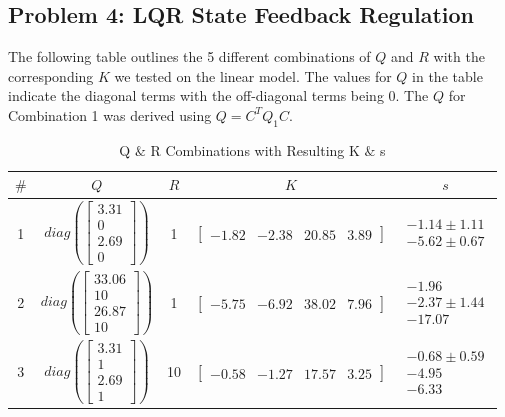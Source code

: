 \subsection*{Problem 4: LQR State Feedback Regulation}

The following table outlines the 5 different combinations of $Q$ and $R$ with the corresponding $K$ we tested on the linear model. The values for $Q$ in the table indicate the diagonal terms with the off-diagonal terms being 0. The $Q$ for Combination 1 was derived using $Q = C^TQ_1C$.

\begin{table}[!ht]
    \centering
    \caption{Q $\&$ R Combinations with Resulting K $\&$ s}
    \begin{tabular}{|*5{c|}}
        \hline
        $\#$ & $Q$                                                                           & $R$ & $K$                                                           & $s$                                                             \\ [0.5ex]
        \hline
        1    & $diag\left(\begin{bmatrix}3.31 \\ 0  \\ 2.69 \\ 0 \end{bmatrix}\right)$       & 1   & $\begin{bmatrix} -1.82 & -2.38 & 20.85 & 3.89 \end{bmatrix}$  & $\begin{array}{cc} -1.14\pm1.11 \\ -5.62\pm0.67 \end{array}$    \\
        \hline
        2    & $diag\left(\begin{bmatrix}33.06 \\ 10  \\ 26.87 \\ 10 \end{bmatrix}\right)$   & 1   & $\begin{bmatrix} -5.75 & -6.92 & 38.02  & 7.96 \end{bmatrix}$ & $\begin{array}{cc} -1.96 \\ -2.37\pm1.44 \\  -17.07\end{array}$ \\
        \hline
        3    & $diag\left(\begin{bmatrix}3.31 \\ 1  \\ 2.69 \\ 1 \end{bmatrix}\right)$       & 10  & $\begin{bmatrix} -0.58 & -1.27 & 17.57 & 3.25 \end{bmatrix}$  & $\begin{array}{cc} -0.68\pm0.59 \\ -4.95 \\  -6.33\end{array}$  \\

\end{tabular}
\end{table}
